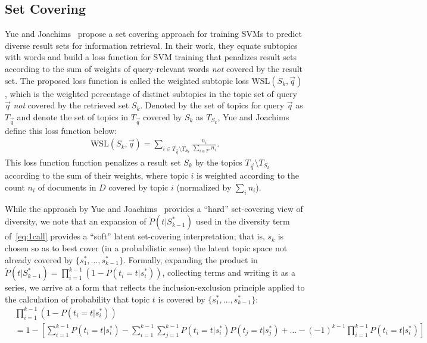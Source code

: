 \subsection{Set Covering}
Yue and Joachims~\cite{yue081224Predicting} propose a set covering
approach for training SVMs to predict diverse result sets for
information retrieval. In their work, they equate subtopics with
words and build a loss function for SVM training that penalizes result
sets according to the sum of weights of query-relevant words
\emph{not} covered by the result set. The proposed loss function is called the weighted subtopic loss $\text{WSL}(S_k,
\vec{q})$, which is the weighted percentage of distinct
subtopics in the topic set of query $\vec{q}$ \emph{not} covered by the
retrieved set $S_k$. Denoted by the set of topics for query
$\vec{q}$ as $T_{\vec{q}}$ and denote the set of topics in $T_{\vec{q}}$ covered
by $S_k$ as $T_{S_{k}}$, Yue and Joachims define this loss function below:
\begin{align}
    \text{WSL}(S_k, \vec{q}) = \sum_{i \in T_{\vec{q}} \setminus T_{S_{k}}} \frac{n_{i}}{\sum_{i \in T'} n_{i}} \label{eq:wsl}.
\end{align}
This loss function function penalizes a result set $S_k$ by the topics
$T_{\vec{q}} \setminus T_{S_{k}}$ according to the sum of their weights, where topic $i$ is weighted according to the count $n_i$ of documents in $D$
covered by topic $i$ (normalized by $\sum_i n_i$).

While the approach by Yue and Joachims~\cite{yue081224Predicting} provides a ``hard'' set-covering view of diversity, we note that an expansion of
$\tilde{P}(t | S_{k-1}^*)$ used in the diversity term
of~\eqref{eq:1call} provides a ``soft'' latent set-covering
interpretation; that is, $s_k$ is chosen so as to best cover (in a
probabilistic sense) the latent topic space not already covered by $\{
s_1^*,\ldots,s_{k-1}^* \}$.  Formally, expanding the product in
$\tilde{P}(t | S_{k-1}^*) = \prod_{i=1}^{k-1} \left(1 -
P(t_{i}=t|s_{i}^{*})\right)$, collecting terms and writing it as a
series, we arrive at a form that reflects the inclusion-exclusion
principle applied to the calculation of probability that topic $t$ is
covered by $\{ s_1^*,\ldots,s_{k-1}^* \}$:
\begin{align}
& \prod_{i=1}^{k-1} \left(1 - P(t_{i}=t|s_{i}^{*})\right) \nonumber \\
& = 1 - \left[ \sum_{i=1}^{k-1} P(t_{i}= t|s_{i}^{*}) - \sum_{i=1}^{k-1}\sum_{j=1}^{k-1}P(t_{i}= t|s_{i}^{*})P(t_{j}= t|s_{j}^{*}) + \dots - (-1)^{k-1}\prod_{i=1}^{k-1}P(t_{i}=t|s_{i}^{*})\right] \label{eq:setcover}
\end{align}


